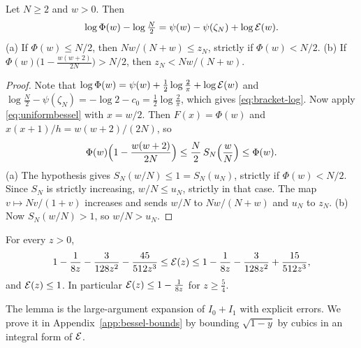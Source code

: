 \begin{lemma}\label{lem:bracket}
Let $N\ge2$ and $w>0$. Then
\begin{equation}\label{eq:bracket-log}
\log\Phi(w)-\log\tfrac N2=\psi(w)-\psi(\zeta_N)+\log \mathcal E(w).
\end{equation}
(a) If $\Phi(w)\le N/2$, then $Nw/(N+w)\le z_N$, strictly if $\Phi(w)<N/2$.
(b) If $\Phi(w)\bigl(1-\frac{w(w+2)}{2N}\bigr)>N/2$, then $z_N<Nw/(N+w)$.
\end{lemma}

\begin{proof}
Note that $\log\Phi(w)=\psi(w)+\frac12\log\frac2\pi+\log \mathcal E(w)$ and
$\log\frac N2-\psi(\zeta_N)=-\log2-c_0=\frac12\log\frac2\pi$, which gives
\eqref{eq:bracket-log}. Now apply \eqref{eq:uniformbessel} with $x=w/2$. Then
$F(x)=\Phi(w)$ and $x(x+1)/h=w(w+2)/(2N)$, so
\[
\Phi(w)\Bigl(1-\frac{w(w+2)}{2N}\Bigr)\le\frac N2\,S_N\Bigl(\frac wN\Bigr)\le\Phi(w).
\]
(a) The hypothesis gives $S_N(w/N)\le1=S_N(u_N)$, strictly if $\Phi(w)<N/2$.
Since $S_N$ is strictly increasing, $w/N\le u_N$, strictly in that case. The
map $v\mapsto Nv/(1+v)$ increases and sends $w/N$ to $Nw/(N+w)$ and $u_N$ to
$z_N$. (b) Now $S_N(w/N)>1$, so $w/N>u_N$.
\end{proof}

\begin{lemma}\label{lem:bessel-bounds}
For every $z>0$,
\[
1-\frac1{8z}-\frac3{128z^2}-\frac{45}{512z^3}\le \mathcal E(z)\le1-\frac1{8z}-\frac3{128z^2}+\frac{15}{512z^3},
\]
and $\mathcal E(z)\le1$. In particular $\mathcal E(z)\le1-\frac1{8z}$ for $z\ge\frac54$.
\end{lemma}

The lemma is the large-argument expansion of $I_0+I_1$ with explicit errors.
We prove it in Appendix~\ref{app:bessel-bounds} by bounding $\sqrt{1-y}$ by cubics
in an integral form of $\mathcal E$.


